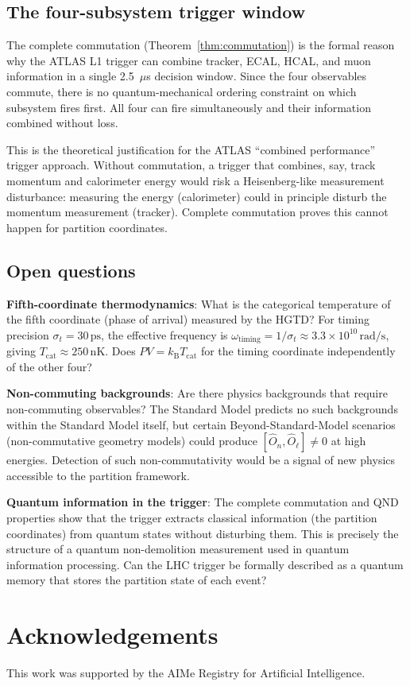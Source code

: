 \documentclass[twocolumn,10pt,a4paper]{article}
\theoremstyle{thmstyle}
\theoremstyle{definition}
\theoremstyle{remark}
\newcommand{\kB}{k_{\mathrm{B}}}
\begin{document}
\subsection{The four-subsystem trigger window}

The complete commutation (Theorem~\ref{thm:commutation}) is the formal
reason why the ATLAS L1 trigger can combine tracker, ECAL, HCAL, and
muon information in a single 2.5~$\mu$s decision window.
Since the four observables commute, there is no quantum-mechanical
ordering constraint on which subsystem fires first. All four can fire
simultaneously and their information combined without loss.

This is the theoretical justification for the ATLAS ``combined performance''
trigger approach. Without commutation, a trigger that combines, say, track
momentum and calorimeter energy would risk a Heisenberg-like measurement
disturbance: measuring the energy (calorimeter) could in principle disturb
the momentum measurement (tracker). Complete commutation proves this
cannot happen for partition coordinates.

\subsection{Open questions}

\textbf{Fifth-coordinate thermodynamics}: What is the categorical temperature
of the fifth coordinate (phase of arrival) measured by the HGTD?
For timing precision $\sigma_t = 30\,\mathrm{ps}$, the effective frequency is
$\omega_{\mathrm{timing}} = 1/\sigma_t \approx 3.3\times 10^{10}\,\mathrm{rad/s}$,
giving $T_{\mathrm{cat}} \approx 250\,\mathrm{nK}$.
Does $PV = \kB T_{\mathrm{cat}}$ for the timing coordinate independently
of the other four?

\textbf{Non-commuting backgrounds}: Are there physics backgrounds that
require non-commuting observables? The Standard Model predicts no such
backgrounds within the Standard Model itself, but certain Beyond-Standard-Model
scenarios (non-commutative geometry models) could produce $[\hat{O}_n, \hat{O}_\ell]
\neq 0$ at high energies. Detection of such non-commutativity would be a
signal of new physics accessible to the partition framework.

\textbf{Quantum information in the trigger}: The complete commutation
and QND properties show that the trigger extracts classical information
(the partition coordinates) from quantum states without disturbing them.
This is precisely the structure of a quantum non-demolition measurement
used in quantum information processing. Can the LHC trigger be formally
described as a quantum memory that stores the partition state of each event?

\section*{Acknowledgements}
This work was supported by the AIMe Registry for Artificial Intelligence.



\end{document}
